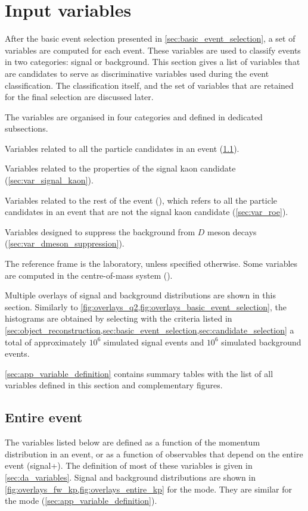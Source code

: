 \section{Input variables} \label{sec:input_variables}
After the basic event selection presented in \cref{sec:basic_event_selection}, a set of variables are computed for each event.
These variables are used to classify events in two categories: signal or background.
This section gives a list of variables that are candidates to serve as discriminative variables used during the event classification.
The classification itself, and the set of variables that are retained for the final selection are discussed later.

The variables are organised in four categories and defined in dedicated subsections.
\bi
\item Variables related to all the particle candidates in an event (\cref{sec:var_entire_event}).
\item Variables related to the properties of the signal kaon candidate (\cref{sec:var_signal_kaon}).
\item Variables related to the rest of the event (\ROE), which refers to all the particle candidates in an event that are not the signal kaon candidate (\cref{sec:var_roe}).
\item Variables designed to suppress the background from $D$ meson decays (\cref{sec:var_dmeson_suppression}).
\ei

The reference frame is the laboratory, unless specified otherwise.
Some variables are computed in the centre-of-mass system (\CMS).

Multiple overlays of signal and background distributions are shown in this section.
Similarly to \cref{fig:overlays_q2,fig:overlays_basic_event_selection}, the histograms are obtained by selecting with the criteria listed in \cref{sec:object_reconstruction,sec:basic_event_selection,sec:candidate_selection} a total of approximately $10^6$ simulated signal events and $10^6$ simulated background events.

\cref{sec:app_variable_definition} contains summary tables with the list of all variables defined in this section and complementary figures.
\subsection{Entire event} \label{sec:var_entire_event}
The variables listed below are defined as a function of the momentum distribution in an event, or as a function of observables that depend on the entire event (signal+\ROE).
The definition of most of these variables is given in \cref{sec:da_variables}.
Signal and background distributions are shown in \cref{fig:overlays_fw_kp,fig:overlays_entire_kp} for the \BKpnn mode.
They are similar for the \BKznn mode (\cref{sec:app_variable_definition}).

